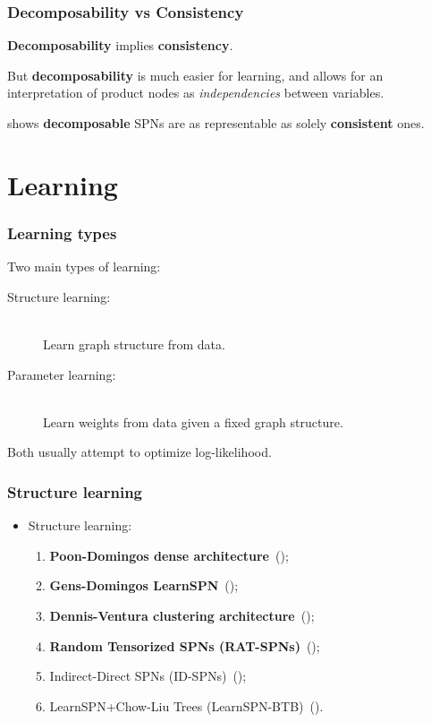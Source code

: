\documentclass[usenames,dvipsnames]{beamer}
\begin{document}
\begin{frame}
  \frametitle{Decomposability vs Consistency}

  \textbf{Decomposability} implies \textbf{consistency}.
  \vfill

  But \textbf{decomposability} is much easier for learning, and allows for an interpretation of
  product nodes as \emph{independencies} between variables.
  \vfill

  \cite{theoretical-spn} shows \textbf{decomposable} SPNs are as representable as solely
  \textbf{consistent} ones.
\end{frame}


\section{Learning}

\begin{frame}
  \frametitle{Learning types}

  Two main types of learning:

  \begin{description}
    \item[Structure learning:]~\\
      Learn graph structure from data.
    \item[Parameter learning:]~\\
      Learn weights from data given a fixed graph structure.
  \end{description}

  Both usually attempt to optimize log-likelihood.

\end{frame}

\begin{frame}
  \frametitle{Structure learning}

  \begin{itemize}
    \item Structure learning:
      \begin{enumerate}
        \item \textbf{Poon-Domingos dense architecture}~(\cite{poon-domingos});
        \item \textbf{Gens-Domingos LearnSPN}~(\cite{gens-domingos});
        \item \textbf{Dennis-Ventura clustering architecture}~(\cite{clustering});
        \item \textbf{Random Tensorized SPNs (RAT-SPNs)}~(\cite{deep-learn-spn});
        \item Indirect-Direct SPNs (ID-SPNs)~(\cite{id-spn});
        \item LearnSPN+Chow-Liu Trees (LearnSPN-BTB)~(\cite{vergari-mauro}).
      \end{enumerate}
  \end{itemize}

\end{frame}
\end{document}
